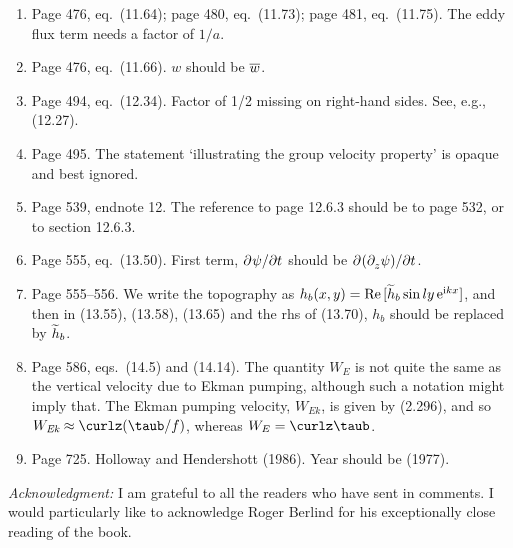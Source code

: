 \documentclass[10pt]{article}
\newcommand{\eq}{eq.\ } \newcommand{\Eq}{Eq.\ }
\begin{document}
\begin{enumerate}
\item Page 476, \eq (11.64); page 480, \eq (11.73);  page 481, \eq(11.75). The eddy flux term needs a factor of $1/a$.

\item Page 476, \eq (11.66). $w$ should be $\overline w$.

 \item Page 494, \eq (12.34). Factor of 1/2 missing on right-hand sides. See, e.g., (12.27).

 \item Page 495. The statement `illustrating the group velocity property' is opaque and best ignored.

 \item Page 539, endnote 12. The reference to page 12.6.3 should be to page 532, or to section 12.6.3.

 \item Page 555, \eq (13.50). First term, ${\partial^{} \psi / \partial t^{}}$ should be ${\partial^{}  ({\partial^{}_{z} \psi }) / \partial t^{}}$.

 \item Page 555--556. We write the topography as $h_b(x,y)= \text{Re}\, [ \widetilde{h}_b \sin ly \, \mathrm{e}^{\mathrm{i} kx} ]$, and then in (13.55), (13.58), (13.65) and the rhs of (13.70), $h_b$ should be replaced by $\widetilde h_b$.

 \item Page 586, eqs.\ (14.5) and (14.14). The quantity $W_E$ is not quite the same as the vertical velocity due to Ekman pumping, although such a notation might imply that. The Ekman pumping velocity, $W_{\textit{Ek}}$, is given by (2.296), and so $W_{\textit{Ek}} \approx \curlz (\taub/f)$, whereas $W_E = \curlz \taub$.

 \item Page 725. Holloway and Hendershott (1986). Year should be (1977).

\end{enumerate}

\noindent \textit{Acknowledgment:} I am grateful to all the readers who have sent in comments. I would particularly like to acknowledge Roger Berlind for his exceptionally close reading of the book.
\end{document}
